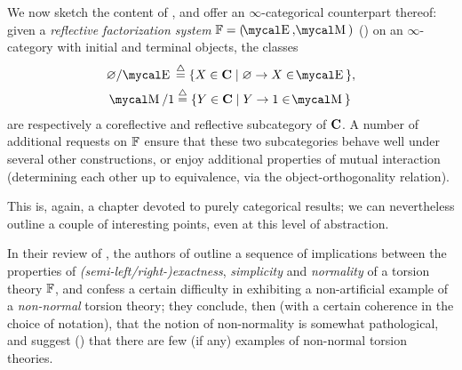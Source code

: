 We now sketch the content of \cite[\S\textbf{6}]{CHK}, and offer an $\infty$\hyp{}categorical counterpart thereof: given a \emph{reflective factorization system} $\fF= (\EE,\MM)$ (\aprop {}) on an $\infty$\hyp{}category with initial and terminal objects, the classes
\begin{gather}
\varnothing/\,\EE \defequal \{ X \in \CC \mid \varnothing\to X \in \EE \},\notag\\
\MM / 1 \defequal \{Y \in\CC \mid Y\to 1 \in\MM\}\label{tor.and.torfre}
\end{gather}
are respectively a coreflective and reflective subcategory of $\textbf{C}$. A number of additional requests on $\mathbb{F}$ ensure that these two subcategories behave well under several other constructions, or enjoy additional properties of mutual interaction (\eg determining each other up to equivalence, via the object\hyp{}orthogonality relation).

This is, again, a chapter devoted to purely categorical results; we can nevertheless outline a couple of interesting points, even at this level of abstraction. 

In their review of \cite{CHK}, the authors of \cite{RT} outline a sequence of implications between the properties of \emph{(semi\hyp{}left\fshyp{}right-)exactness}, \emph{simplicity} and \emph{normality} of a torsion theory $\mathbb{F}$, and confess a certain difficulty in exhibiting a non\hyp{}artificial example of a \emph{non\hyp{}normal} torsion theory; they conclude, then (with a certain coherence in the choice of notation), that the notion of non\hyp{}normality is somewhat pathological, and suggest (\cite[Remark \textbf{4.11}]{RT}) that there are few (if any) examples of non\hyp{}normal torsion theories.

